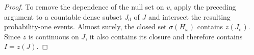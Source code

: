 \documentclass[10pt,a4paper]{amsart}
\begin{document}
\begin{proof}
To remove the dependence of the null set on $v$, apply the preceding argument
to a countable dense subset $J_{\mathrm d}$ of $J$ and intersect the resulting
probability-one events.  Almost surely, the closed set $\sigma(H_\omega)$
contains $z(J_{\mathrm d})$.  Since $z$ is continuous on $J$,
it also contains its closure and therefore contains $I=z(J)$.
\end{proof}
\end{document}
